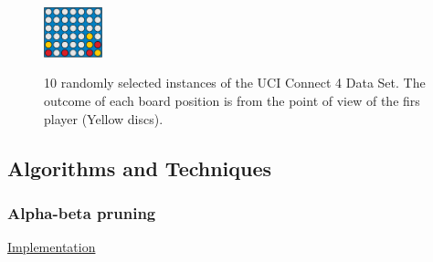 \documentclass{article}
\newcommand{\GithubURL}[2]{
\noindent
\href{https://github.com/davidrobles/mlnd-capstone-code/blob/master/#1}{#2}
\break
}
\begin{document}
\begin{figure}[!h]
{        \label{fig:c4-exp-7}
        \includegraphics[width=0.15\textwidth]{figures/c4_exploration_7_win.pdf}
    } \hspace{0.1in}
     \hspace{0.1in}
     \hspace{0.1in}
    \caption{10 randomly selected instances of the UCI Connect 4 Data Set. The outcome of each board
    position is from the point of view of the firs player (Yellow discs).}
    \label{fig:c4-exp}
\end{figure}

\subsection{Algorithms and Techniques}

\subsubsection{Alpha-beta pruning}

\GithubURL{capstone/player/alphabeta.py}{Implementation}
\end{document}
